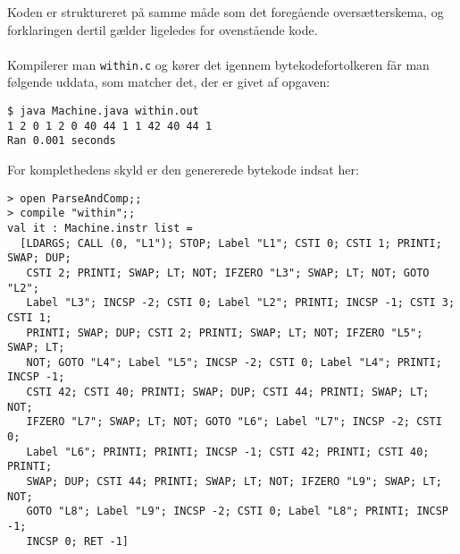 Koden er struktureret på samme måde som det foregående oversætterskema, og forklaringen dertil gælder ligeledes for ovenstående kode.
\\\\
Kompilerer man \texttt{within.c} og kører det igennem bytekodefortolkeren får man følgende uddata, som matcher det, der er givet af opgaven:

\begin{verbatim}
$ java Machine.java within.out
1 2 0 1 2 0 40 44 1 1 42 40 44 1
Ran 0.001 seconds
\end{verbatim}

For komplethedens skyld er den genererede bytekode indsat her:

\begin{verbatim}
> open ParseAndComp;;
> compile "within";;
val it : Machine.instr list =
  [LDARGS; CALL (0, "L1"); STOP; Label "L1"; CSTI 0; CSTI 1; PRINTI; SWAP; DUP;
   CSTI 2; PRINTI; SWAP; LT; NOT; IFZERO "L3"; SWAP; LT; NOT; GOTO "L2";
   Label "L3"; INCSP -2; CSTI 0; Label "L2"; PRINTI; INCSP -1; CSTI 3; CSTI 1;
   PRINTI; SWAP; DUP; CSTI 2; PRINTI; SWAP; LT; NOT; IFZERO "L5"; SWAP; LT;
   NOT; GOTO "L4"; Label "L5"; INCSP -2; CSTI 0; Label "L4"; PRINTI; INCSP -1;
   CSTI 42; CSTI 40; PRINTI; SWAP; DUP; CSTI 44; PRINTI; SWAP; LT; NOT;
   IFZERO "L7"; SWAP; LT; NOT; GOTO "L6"; Label "L7"; INCSP -2; CSTI 0;
   Label "L6"; PRINTI; PRINTI; INCSP -1; CSTI 42; PRINTI; CSTI 40; PRINTI;
   SWAP; DUP; CSTI 44; PRINTI; SWAP; LT; NOT; IFZERO "L9"; SWAP; LT; NOT;
   GOTO "L8"; Label "L9"; INCSP -2; CSTI 0; Label "L8"; PRINTI; INCSP -1;
   INCSP 0; RET -1]
\end{verbatim}
